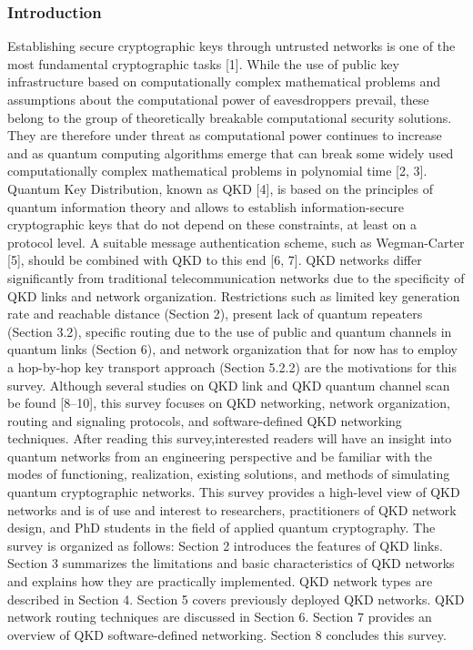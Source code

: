\subsubsection{Introduction}
Establishing secure cryptographic keys through untrusted networks is one of the most fundamental cryptographic tasks [1]. While the use of public key infrastructure based on computationally complex mathematical problems and assumptions about the computational power of eavesdroppers prevail, these belong to the group of theoretically breakable computational security solutions.
They are therefore under threat as computational power continues to increase and as quantum computing algorithms emerge that can break some widely used computationally complex mathematical problems in polynomial time [2, 3]. Quantum Key Distribution, known as QKD [4], is based on the principles of quantum information theory and allows to establish information-secure cryptographic keys that do not depend on these constraints, at least on a protocol level. A suitable message authentication scheme, such as Wegman-Carter [5], should be combined with QKD to this end [6, 7].
QKD networks differ significantly from traditional telecommunication networks due to the specificity of QKD links and network organization. Restrictions such as limited key generation rate and reachable distance (Section 2), present lack of quantum repeaters (Section 3.2), specific routing due to the use of public and quantum channels in quantum links (Section 6), and network organization that for now has to employ a hop-by-hop key transport approach (Section 5.2.2) are the motivations for this survey. Although several studies on QKD link and QKD quantum channel scan be found [8–10], this survey focuses on QKD networking, network organization, routing and signaling protocols, and software-defined QKD networking techniques. After reading this survey,interested readers will have an insight into quantum networks from an engineering perspective and be familiar with the modes of functioning, realization, existing solutions, and methods of simulating quantum cryptographic networks. This survey provides a high-level view of QKD networks and is of use and interest to researchers, practitioners of QKD network design, and PhD students in the field of applied quantum cryptography.
The survey is organized as follows: Section 2 introduces the features of QKD links. Section 3 summarizes the limitations and basic characteristics of QKD networks and explains how they are practically implemented. QKD network types are described in Section 4. Section 5 covers previously deployed QKD networks. QKD network routing techniques are discussed in Section 6. Section 7 provides an overview of QKD software-defined networking. Section 8 concludes this survey.

